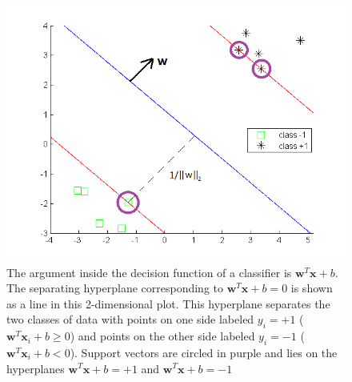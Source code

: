 \begin{figure}
\centering
\includegraphics[width=0.55\linewidth]{images/Separatrice_lineaire_avec_marges2}
\caption{The argument inside the decision function of a classifier is $\textbf{w}^T\textbf{x} + b$. The separating hyperplane corresponding to $\textbf{w}^T\textbf{x} + b = 0$ is shown as a line in this 2-dimensional plot. This hyperplane separates the two classes of data with points on one side labeled $y_i = +1$ ($\textbf{w}^T\textbf{x}_i + b \geq 0$) and points on the other side labeled $y_i=-1$ ($\textbf{w}^T\textbf{x}_i + b < 0$). Support vectors are circled in purple and lies on the hyperplanes $\textbf{w}^T\textbf{x} + b = +1$ and $\textbf{w}^T\textbf{x} + b = -1$}
\label{fig:Separatrice_lineaire_avec_marges}
\end{figure}




